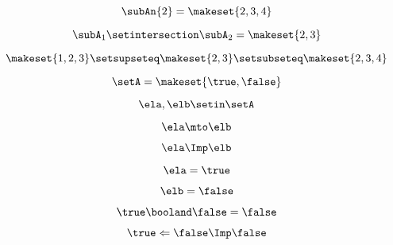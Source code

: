 {\begin{forslides}
        \begin{equation}
            \label{eq:feedback-028}
            \subAn{2} = \makeset{2, 3, 4 }
        \end{equation}

        \begin{equation}
            \label{eq:feedback-029}
            \subA_1 \setintersection \subA_2 = \makeset{2, 3 }
        \end{equation}

        \begin{equation}
            \label{eq:feedback-030}
            \makeset{ 1, 2, 3 } \setsupseteq \makeset{2, 3 } \setsubseteq \makeset{2, 3, 4 }
        \end{equation}

        \begin{equation}
            \label{eq:feedback-031}
            \setA = \makeset{ \true, \false }
        \end{equation}

        \begin{equation}
            \label{eq:feedback-032}
            \ela, \elb  \setin \setA
        \end{equation}

        \begin{equation}
            \label{eq:feedback-033}
            \ela \mto \elb
        \end{equation}

        \begin{equation}
            \label{eq:feedback-034}
            \ela \Imp \elb
        \end{equation}

        \begin{equation}
            \label{eq:feedback-035}
            \ela = \true
        \end{equation}

        \begin{equation}
            \label{eq:feedback-036}
            \elb= \false
        \end{equation}

        \begin{equation}
            \label{eq:feedback-037}
            \true \booland \false = \false
        \end{equation}

        \begin{equation}
            \label{eq:feedback-038}
            \true \Leftarrow \false \Imp \false
        \end{equation}


\end{forslides}}
